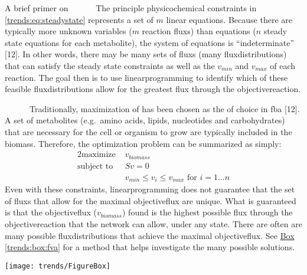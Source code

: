 \begin{pabox}[label=trends:box:fba]{A brief primer on }
~~~~~~The principle physicochemical constraints in \autoref{trends:eq:steadystate} 
represents a set of $m$ linear equations. 
Because there are typically more unknown variables ($m$ reaction \glspl{flux}) than equations ($n$ steady state
equations for each metabolite), the system of equations is ``indeterminate'' [12].
In other words, there may be many sets of \glspl{flux} (many \glspl{fluxdistribution}) that 
can satisfy the steady state constraints as well as the $v_{min}$ and $v_{max}$ of each reaction.
The goal then is to use \gls{linearprogramming} to identify which of these feasible \glspl{fluxdistribution}
allow for the greatest \gls{flux} through the \gls{objectivereaction}.

~~~~~~Traditionally, maximization of  has been 
chosen as the  of choice in \gls{fba} [12]. A set 
of metabolites (e.g.\ amino acids, lipids, nucleotides and 
carbohydrates) that are necessary for the cell or organism 
to grow are typically included in the \gls{biomass}. 
Therefore, the optimization problem can be summarized as simply:
\begin{alignat*}{2}
\text{maximize  }   & v_{biomass}  \\
\text{subject to  } & Sv=0 \\
                   & v_{min} \leq v_i \leq v_{max} \text{ for } i=1...n
\end{alignat*}
Even with these constraints, \gls{linearprogramming} does not guarantee that the set of \glspl{flux} that
allow for the maximal \gls{objectiveflux} are unique. What is 
guaranteed is that the \gls{objectiveflux} ($v_{biomass}$) found is the
highest possible \gls{flux} through the \gls{objectivereaction} that the network can allow, under any state.
There are often are many possible \glspl{fluxdistribution} that achieve
the maximal \gls{objectiveflux}. See \hyperref[trends:box:fva]{Box \ref{trends:box:fva}} for
a method that helps investigate the many possible solutions.


  \centering
  \texttt{[image: trends/FigureBox]}
  \label{trends:figbox}

\end{pabox}